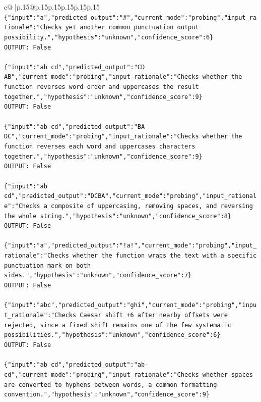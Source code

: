 \documentclass{article}
\begin{document}
{\begin{supertabular}{c@{$\;$}|p{.15\linewidth}@{}p{.15\linewidth}p{.15\linewidth}p{.15\linewidth}p{.15\linewidth}p{.15\linewidth}}
{{{\\ 
\texttt{\{"input":"a","predicted\_output":"\#","current\_mode":"probing","input\_rationale":"Checks yet another common punctuation output possibility.","hypothesis":"unknown","confidence\_score":6\}} \\
\texttt{OUTPUT: False} \\
\\ 
\texttt{\{"input":"ab cd","predicted\_output":"CD AB","current\_mode":"probing","input\_rationale":"Checks whether the function reverses word order and uppercases the result together.","hypothesis":"unknown","confidence\_score":9\}} \\
\texttt{OUTPUT: False} \\
\\ 
\texttt{\{"input":"ab cd","predicted\_output":"BA DC","current\_mode":"probing","input\_rationale":"Checks whether the function reverses each word and uppercases characters together.","hypothesis":"unknown","confidence\_score":9\}} \\
\texttt{OUTPUT: False} \\
\\ 
\texttt{\{"input":"ab cd","predicted\_output":"DCBA","current\_mode":"probing","input\_rationale":"Checks a composite of uppercasing, removing spaces, and reversing the whole string.","hypothesis":"unknown","confidence\_score":8\}} \\
\texttt{OUTPUT: False} \\
\\ 
\texttt{\{"input":"a","predicted\_output":"!a!","current\_mode":"probing","input\_rationale":"Checks whether the function wraps the text with a specific punctuation mark on both sides.","hypothesis":"unknown","confidence\_score":7\}} \\
\texttt{OUTPUT: False} \\
\\ 
\texttt{\{"input":"abc","predicted\_output":"ghi","current\_mode":"probing","input\_rationale":"Checks Caesar shift +6 after nearby offsets were rejected, since a fixed shift remains one of the few systematic possibilities.","hypothesis":"unknown","confidence\_score":6\}} \\
\texttt{OUTPUT: False} \\
\\ 
\texttt{\{"input":"ab cd","predicted\_output":"ab{-}cd","current\_mode":"probing","input\_rationale":"Checks whether spaces are converted to hyphens between words, a common formatting convention.","hypothesis":"unknown","confidence\_score":9\}} \\
}}}
\end{supertabular}}
\end{document}
